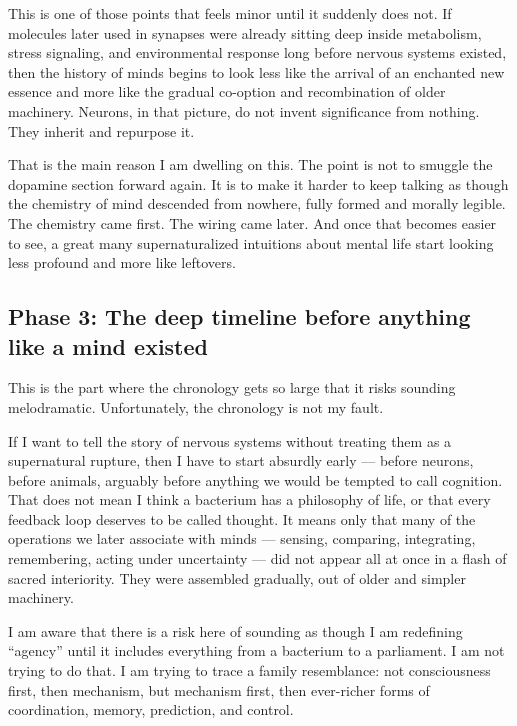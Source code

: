 This is one of those points that feels minor until it suddenly does not. If molecules later used in synapses were already sitting deep inside metabolism, stress signaling, and environmental response long before nervous systems existed, then the history of minds begins to look less like the arrival of an enchanted new essence and more like the gradual co-option and recombination of older machinery. Neurons, in that picture, do not invent significance from nothing. They inherit and repurpose it.

That is the main reason I am dwelling on this. The point is not to smuggle the dopamine section forward again. It is to make it harder to keep talking as though the chemistry of mind descended from nowhere, fully formed and morally legible. The chemistry came first. The wiring came later. And once that becomes easier to see, a great many supernaturalized intuitions about mental life start looking less profound and more like leftovers.

\subsection{Phase 3: The deep timeline before anything like a mind existed}\label{03_it_started-phase-3-the-deep-timeline-before-anything-like-a-mind-existed}

This is the part where the chronology gets so large that it risks sounding melodramatic. Unfortunately, the chronology is not my fault.

If I want to tell the story of nervous systems without treating them as a supernatural rupture, then I have to start absurdly early --- before neurons, before animals, arguably before anything we would be tempted to call cognition. That does not mean I think a bacterium has a philosophy of life, or that every feedback loop deserves to be called thought. It means only that many of the operations we later associate with minds --- sensing, comparing, integrating, remembering, acting under uncertainty --- did not appear all at once in a flash of sacred interiority. They were assembled gradually, out of older and simpler machinery.

I am aware that there is a risk here of sounding as though I am redefining ``agency'' until it includes everything from a bacterium to a parliament. I am not trying to do that. I am trying to trace a family resemblance: not consciousness first, then mechanism, but mechanism first, then ever-richer forms of coordination, memory, prediction, and control.

